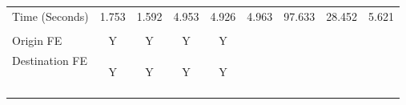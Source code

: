 \begin{center}
\begin{tabular}{lcccccccc}
\noalign{\smallskip}Time (Seconds) & 1.753 & 1.592 & 4.953 & 4.926 & 4.963 & 97.633 & 28.452 & 5.621\\
 & \begin{footnotesize}\end{footnotesize} & \begin{footnotesize}\end{footnotesize} & \begin{footnotesize}\end{footnotesize} & \begin{footnotesize}\end{footnotesize} & \begin{footnotesize}\end{footnotesize} & \begin{footnotesize}\end{footnotesize} & \begin{footnotesize}\end{footnotesize} & \begin{footnotesize}\end{footnotesize}\\
\noalign{\smallskip}Origin FE & Y & Y & Y & Y &  &  &  & \\
Destination FE & \begin{footnotesize}Y\end{footnotesize} & \begin{footnotesize}Y\end{footnotesize} & \begin{footnotesize}Y\end{footnotesize} & \begin{footnotesize}Y\end{footnotesize} & \begin{footnotesize}\end{footnotesize} & \begin{footnotesize}\end{footnotesize} & \begin{footnotesize}\end{footnotesize} & \begin{footnotesize}\end{footnotesize}\\
\noalign{\smallskip}\hline\end{tabular}\\
\end{center}

